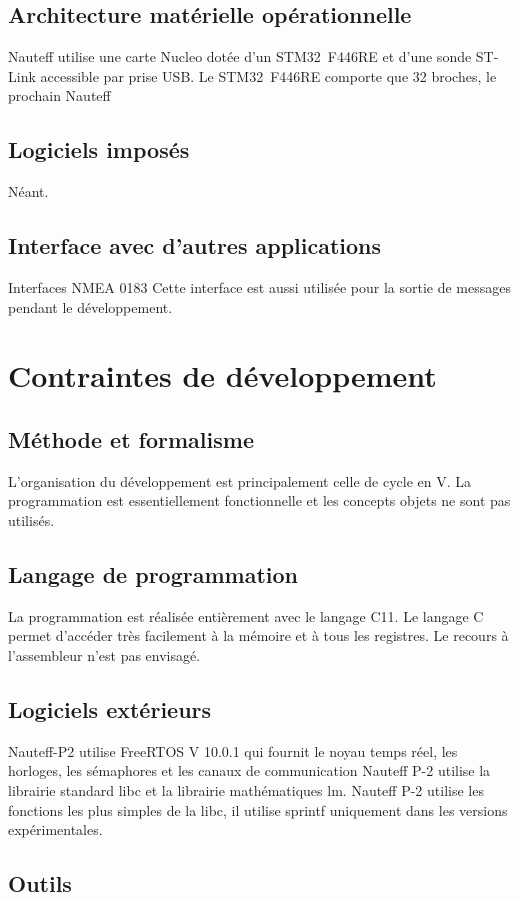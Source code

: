 \documentclass[a4paper,11pt]{report}
\begin{document}
\subsection{Architecture matérielle opérationnelle}
Nauteff utilise une carte Nucleo dotée d'un STM32~F446RE
et d'une sonde ST-Link accessible par prise USB.
Le STM32~F446RE comporte que 32 broches, le prochain Nauteff

\subsection{Logiciels imposés}
Néant.
\subsection{Interface avec d'autres applications}
Interfaces NMEA 0183
Cette interface est aussi utilisée pour la sortie de messages
pendant le développement.
\section{Contraintes de développement}
\subsection{Méthode et formalisme}
L'organisation du développement est principalement celle de cycle en V.
La programmation est essentiellement fonctionnelle et 
les concepts objets ne sont pas utilisés.

\subsection{Langage de programmation}
La programmation est réalisée entièrement avec le langage C11.
Le langage C permet d'accéder très facilement à la mémoire et à tous les registres.
Le recours à l'assembleur n'est pas envisagé.

\subsection{Logiciels extérieurs}
Nauteff-P2 utilise FreeRTOS V 10.0.1 qui fournit le noyau temps réel, les horloges,
les sémaphores et les canaux de communication 
Nauteff P-2 utilise la librairie standard libc et la librairie mathématiques lm.
Nauteff P-2 utilise les fonctions les plus simples de la libc, il utilise sprintf uniquement dans les versions expérimentales.
\subsection{Outils}
\end{document}
